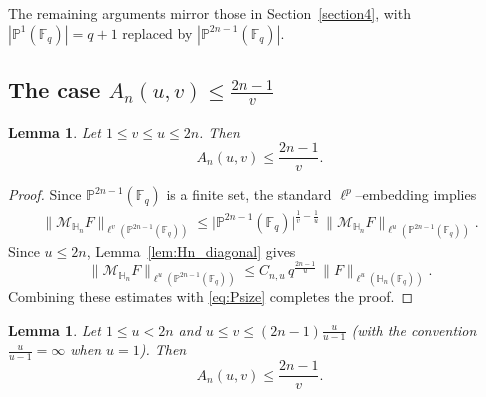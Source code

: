 \documentclass[11pt]{article}
\newtheorem{lemma}[theorem]{Lemma}
\newcommand{\1}{\mathbf 1}
\begin{document}
The remaining arguments mirror those in Section~\ref{section4}, with $|\mathbb{P}^{1}(\mathbb{F}_q)|=q+1$ replaced by
$|\mathbb{P}^{2n-1}(\mathbb{F}_q)|$.


\subsection{The case $A_n(u,v)\le \frac{2n-1}{v}
$}
\begin{lemma}\label{lem:Hn_upper_1}
Let $1\le v\le u\le 2n$.
Then
\[
A_n(u,v)\le \frac{2n-1}{v}.
\]
\end{lemma}

\begin{proof}
Since $\mathbb{P}^{2n-1}(\mathbb{F}_q)$ is a finite set, the standard $\ell^p$--embedding implies
\begin{align}\label{embedding-ell^u}
\|\mathcal{M}_{\mathbb{H}_n}F\|_{\ell^v(\mathbb{P}^{2n-1}(\mathbb{F}_q))}
\le
\bigl|\mathbb{P}^{2n-1}(\mathbb{F}_q)\bigr|^{\frac{1}{v}-\frac{1}{u}}\,
\|\mathcal{M}_{\mathbb{H}_n}F\|_{\ell^u(\mathbb{P}^{2n-1}(\mathbb{F}_q))}.
\end{align}
Since $u\le 2n$, Lemma~\ref{lem:Hn_diagonal} gives
\[
\|\mathcal{M}_{\mathbb{H}_n}F\|_{\ell^u(\mathbb{P}^{2n-1}(\mathbb{F}_q))}
\le
C_{n,u}\, q^{\frac{2n-1}{u}}\,\|F\|_{\ell^u(\mathbb{H}_n(\mathbb{F}_q))}.
\]
Combining these estimates with \eqref{eq:Psize} completes the proof.
\end{proof}



\begin{lemma}\label{lem:Hn_upper_4}
Let $1\leq u<2n$ and $u\le v\le (2n-1)\frac{u}{u-1}$ (with the convention $\frac{u}{u-1}=\infty$ when $u=1$).
Then
\[
A_n(u,v)\le \frac{2n-1}{v}.
\]
\end{lemma}
\end{document}
